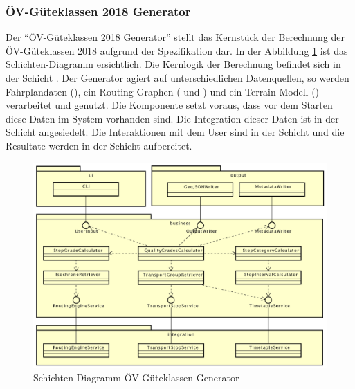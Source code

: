 \subsubsection{ÖV-Güteklassen 2018 Generator}
\label{container:generator}

Der "`\acs{ÖV}-Güteklassen 2018 Generator"' stellt das Kernstück der Berechnung der \acs{ÖV}-Güteklassen 2018 aufgrund der Spezifikation dar.
In der Abbildung \ref{fig:layer_diagram_generator} ist das Schichten-Diagramm ersichtlich.
Die Kernlogik der Berechnung befindet sich in der Schicht \emph{}.
Der Generator agiert auf unterschiedlichen Datenquellen, so werden Fahrplandaten (), ein Routing-Graphen ( und ) und ein Terrain-Modell () verarbeitet und genutzt.
Die Komponente setzt voraus, dass vor dem Starten diese Daten im System vorhanden sind.
Die Integration dieser Daten ist in der Schicht \emph{} angesiedelt.
Die Interaktionen mit dem User sind in der Schicht \emph{} und die Resultate werden in der Schicht \emph{} aufbereitet.

\begin{figure}[ht]
    \centering
    \includegraphics[width=1.0\linewidth]{projectdoc/img/guetklassen_generator_architektur.png}
    \caption[Schichten-Diagramm ÖV-Güteklassen Generator]{Schichten-Diagramm ÖV-Güteklassen Generator}
    \label{fig:layer_diagram_generator}
\end{figure}

